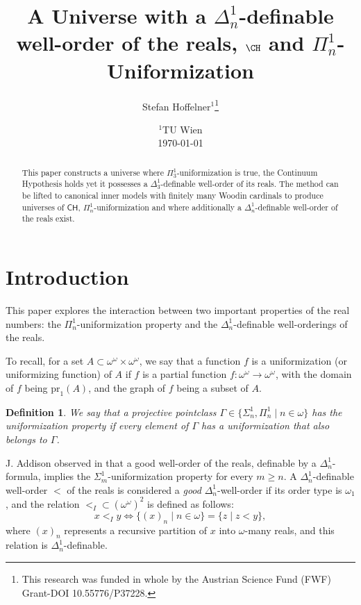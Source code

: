 \documentclass[a4paper,11pt]{article}
\title{A Universe with a $\Delta^1_n$-definable well-order of the reals, $\CH$ and $\Pi^1_n$-Uniformization}
\author{ Stefan Hoffelner$^{1}$\footnote{This research was funded in whole by the Austrian Science Fund (FWF) Grant-DOI 10.55776/P37228. }  }
\date{
    $^1$TU Wien \\
    \today }
\newtheorem{definition}[theorem]{Definition}
\begin{document}
\maketitle

\begin{abstract}
This paper constructs a universe where $\Pi^1_3$-uniformization is true, the Continuum Hypothesis holds yet it possesses a $\Delta^1_3$-definable well-order of its reals. The method can be lifted to canonical inner models with finitely many Woodin cardinals to produce universes of $\mathsf{CH}$, $\Pi^1_n$-uniformization and where additionally a $\Delta^1_n$-definable well-order of the reals exist.
\end{abstract}

\section{Introduction}

This paper explores the interaction between two important properties of the real numbers: the $\Pi^1_n$-uniformization property and the $\Delta^1_n$-definable well-orderings of the reals.

To recall, for a set \( A \subset \omega^\omega \times \omega^\omega \), we say that a function \( f \) is a uniformization (or uniformizing function) of \( A \) if \( f \) is a partial function \( f: \omega^\omega \to \omega^\omega \), with the domain of \( f \) being \( \text{pr}_1(A) \), and the graph of \( f \) being a subset of \( A \).

\begin{definition}
We say that a projective pointclass \( \Gamma \in \{ \Sigma^1_n, \Pi^1_n \mid n \in \omega \} \) has the uniformization property if every element of \( \Gamma \) has a uniformization that also belongs to \( \Gamma \).
\end{definition}

J. Addison observed in \cite{Addison} that a good  well-order of the reals, definable by a \( \Delta^1_n \)-formula, implies the \( \Sigma^1_m \)-uniformization property for every \( m \ge n \). A \( \Delta^1_n \)-definable well-order \( < \) of the reals is considered a \emph{good} \( \Delta^1_n \)-well-order if its order type is \( \omega_1 \), and the relation \( <_I \subset (\omega^\omega)^2 \) is defined as follows:
\[
x <_I y \Leftrightarrow \{(x)_n \mid n \in \omega\} = \{z \mid z < y\},
\]
where \( (x)_n \) represents a recursive partition of \( x \) into \( \omega \)-many reals, and this relation is \( \Delta^1_n \)-definable.
\end{document}
